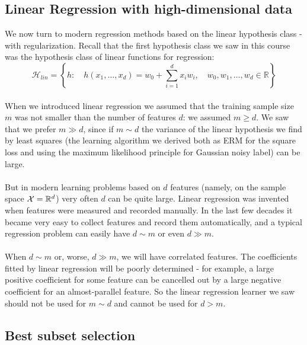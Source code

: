 \documentclass[11pt]{article}
\newcommand{\R}{\ensuremath{\mathbb{R}}}
\newcommand{\Hc}{\mathcal{H}}
\begin{document}
    \subsection{Linear Regression with high-dimensional data}

    We now turn to modern regression methods based on the linear hypothesis
    class - with regularization. Recall that the first hypothesis class we saw
    in this course was the hypothesis class of linear functions for regression: 
     \[
 \Hc_{lin} = \left\{h: \quad h(x_1,\ldots,x_d)= w_0 + \sum_{i=1}^d x_i w_i,  \quad w_0,w_1,\ldots, w_d\in\R
 \right\}
    \]
~\\
    When we introduced linear regression we assumed that the training sample
    size $m$ was not smaller than the number of features $d$: we assumed $m\geq
    d$. We saw that we prefer $m\gg d$, since if $m\sim d$ the variance of the
    linear hypothesis we find by least squares (the learning algorithm we
      derived both as ERM for the square loss and using the maximum likelihood
    principle for Gaussian noisy label) can be large.
\\~\\
    But in modern learning problems based on $d$ features (namely, on the sample
    space $\X=\R^d$) very often $d$ can be quite large. Linear regression was
    invented when features were measured and recorded manually.  In the last few
    decades it became very easy to
    collect features and record them automatically, and a typical regression
    problem can easily have $d\sim m$ or even $d\gg m$. 
\\~\\
    When $d\sim m$ or, worse, $d\gg m$, we will have correlated features. The
    coefficients fitted by linear regression will be poorly determined - for
    example, a large positive coefficient for some feature can be cancelled out
    by a large negative coefficient for an almost-parallel feature. 
    So the linear regression learner we saw should not be used for $m\sim d$ and
    cannot be used for $d>m$.

    \subsection{Best subset selection}
\end{document}
